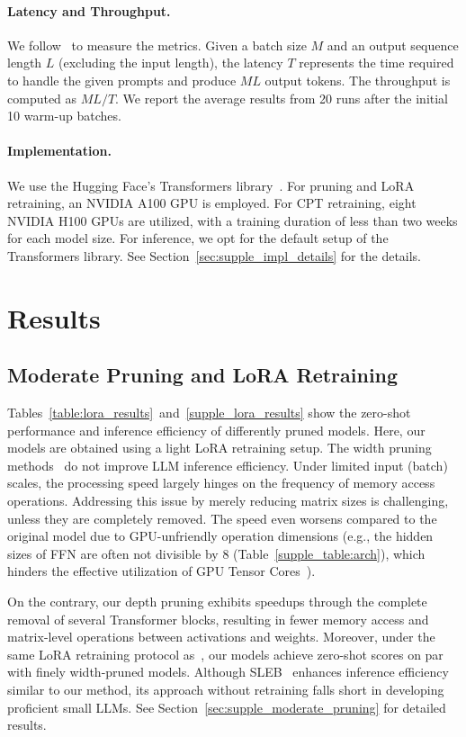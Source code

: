 \paragraph{Latency and Throughput.} We follow~\citet{sheng2023flexgen} to measure the metrics. Given a batch size $M$ and an output sequence length $L$ (excluding the input length), the latency $T$ represents the time required to handle the given prompts and produce $ML$ output tokens. The throughput is computed as $ML/T$. We report the average results from 20 runs after the initial 10 warm-up batches.

\paragraph{Implementation.} We use the Hugging Face's Transformers library~\cite{wolf-etal-2020-transformers}. For pruning and LoRA retraining, an NVIDIA A100 GPU is employed. For CPT retraining, eight NVIDIA H100 GPUs are utilized, with a training duration of less than two weeks for each model size. For inference, we opt for the default setup of the Transformers library. See Section~\ref{sec:supple_impl_details} for the details.

\section{Results}

\subsection{Moderate Pruning and LoRA Retraining}
Tables~\ref{table:lora_results}~and~\ref{supple_lora_results} show the zero-shot performance and inference efficiency of differently pruned models. Here, our models are obtained using a light LoRA retraining setup. The width pruning methods~\cite{llmpruner,flap,wanda} do not improve LLM inference efficiency. Under limited input (batch) scales, the processing speed largely hinges on the frequency of memory access operations. Addressing this issue by merely reducing matrix sizes is challenging, unless they are completely removed. The speed even worsens compared to the original model due to GPU-unfriendly operation dimensions (e.g., the hidden sizes of FFN are often not divisible by 8 (Table~\ref{supple_table:arch}), which hinders the effective utilization of GPU Tensor Cores~\cite{tensor_core_guide}). 

On the contrary, our depth pruning exhibits speedups through the complete removal of several Transformer blocks, resulting in fewer memory access and matrix-level operations between activations and weights. Moreover, under the same LoRA retraining protocol as~\citet{llmpruner}, our models achieve zero-shot scores on par with finely width-pruned models. Although SLEB~\cite{song2024sleb} enhances inference efficiency similar to our method, its approach without retraining falls short in developing proficient small LLMs. See Section~\ref{sec:supple_moderate_pruning} for detailed results.

